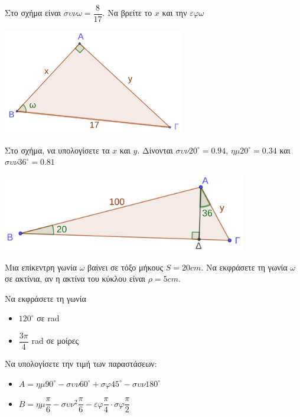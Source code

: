 \documentclass{../presentation}
\begin{document}
\begin{askisi}
  Στο σχήμα είναι $συνω=\dfrac{8}{17}$. Να βρείτε το $x$ και την $εφω$

  \centering
  \includegraphics[width=0.6\textwidth]{"./images/3.1.1_2.png"}
\end{askisi}

\begin{askisi}
  Στο σχήμα, να υπολογίσετε τα $x$ και $y$. Δίνονται $συν20^{\circ}=0.94$, $ημ20^{\circ}=0.34$ και $συν36^{\circ}=0.81$

  \centering
  \includegraphics[width=0.8\textwidth]{"./images/3.1.1_3.png"}
\end{askisi}

\begin{askisi}
  Μια επίκεντρη γωνία $ω$ βαίνει σε τόξο μήκους $S=20cm$. Να εκφράσετε τη γωνία $ω$ σε ακτίνια, αν η ακτίνα του κύκλου είναι $ρ=5cm$.
\end{askisi}

\begin{askisi}
  Να εκφράσετε τη γωνία
  \begin{itemize}
    \item<1-> $120^{\circ}$ σε rad
    \item<2-> $\dfrac{3π}{4}$ rad σε μοίρες
  \end{itemize}
\end{askisi}

\begin{askisi}
  Να υπολογίσετε την τιμή των παραστάσεων:
  \begin{itemize}
    \item<1-> $Α=ημ90^{\circ}-συν60^{\circ}+σφ45^{\circ}-συν180^{\circ}$
    \item<2-> $Β=ημ\dfrac{π}{6}-συν^2\dfrac{π}{6}-εφ\dfrac{π}{4}\cdot σφ\dfrac{π}{2}$
  \end{itemize}
\end{askisi}
\end{document}

